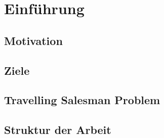 
\section{Einführung}

\subsection{Motivation}

\subsection{Ziele}

\subsection{Travelling Salesman Problem}

\subsection{Struktur der Arbeit}

